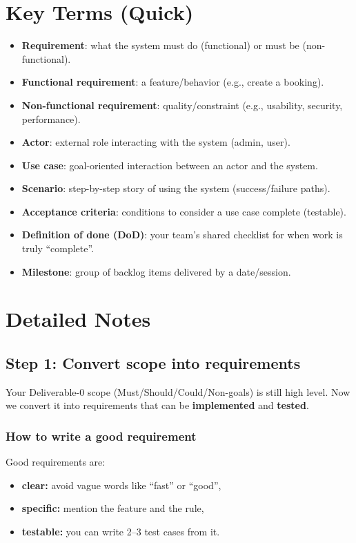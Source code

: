 \documentclass[11pt]{article}
\begin{document}
\section{Key Terms (Quick)}
\begin{itemize}
  \item \textbf{Requirement}: what the system must do (functional) or must be (non-functional).
  \item \textbf{Functional requirement}: a feature/behavior (e.g., create a booking).
  \item \textbf{Non-functional requirement}: quality/constraint (e.g., usability, security, performance).
  \item \textbf{Actor}: external role interacting with the system (admin, user).
  \item \textbf{Use case}: goal-oriented interaction between an actor and the system.
  \item \textbf{Scenario}: step-by-step story of using the system (success/failure paths).
  \item \textbf{Acceptance criteria}: conditions to consider a use case complete (testable).
  \item \textbf{Definition of done (DoD)}: your team's shared checklist for when work is truly ``complete''.
  \item \textbf{Milestone}: group of backlog items delivered by a date/session.
\end{itemize}

\section{Detailed Notes}
\subsection{Step 1: Convert scope into requirements}
Your Deliverable-0 scope (Must/Should/Could/Non-goals) is still high level.
Now we convert it into requirements that can be \textbf{implemented} and \textbf{tested}.

\subsubsection{How to write a good requirement}
Good requirements are:
\begin{itemize}
  \item \textbf{clear:} avoid vague words like ``fast'' or ``good'',
  \item \textbf{specific:} mention the feature and the rule,
  \item \textbf{testable:} you can write 2--3 test cases from it.
\end{itemize}
\end{document}
